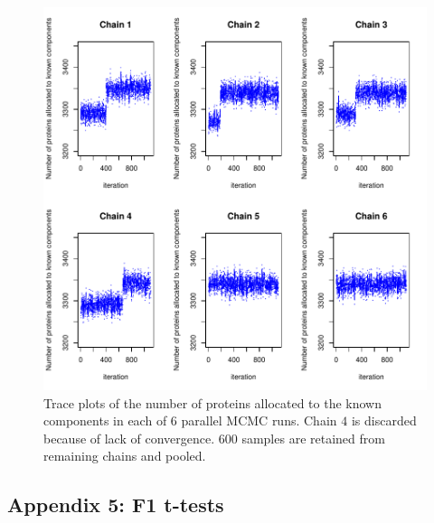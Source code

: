 \documentclass[12pt,english]{article}
\begin{document}
\begin{figure}[ht]
  \centering
\includegraphics{tagm-032}
  \caption{Trace plots of the number of proteins allocated to the known components in each of 6 parallel MCMC runs. Chain $4$ is discarded because of lack of convergence. $600$ samples are retained from remaining chains and pooled.}
  \label{figure::mcmcchains}
\end{figure}




\clearpage

\subsection{Appendix 5: F1 t-tests}\label{app::ttestf1}
\end{document}
